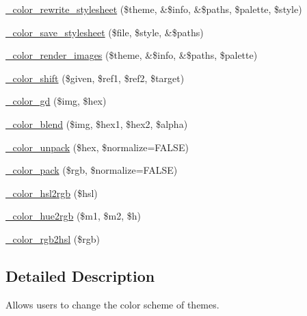 \begin{DoxyCompactItemize}
\item 
\hyperlink{color_8module_aaf1af457b60024710ca91d4563463267}{\_\-color\_\-rewrite\_\-stylesheet} (\$theme, \&\$info, \&\$paths, \$palette, \$style)
\item 
\hyperlink{color_8module_a571b92edd3294e4d7c87092cb3f695d3}{\_\-color\_\-save\_\-stylesheet} (\$file, \$style, \&\$paths)
\item 
\hyperlink{color_8module_a2a6f1003889c56a433d0223fa02849b2}{\_\-color\_\-render\_\-images} (\$theme, \&\$info, \&\$paths, \$palette)
\item 
\hyperlink{color_8module_ae1e559de5aa681e57757d3505974f40b}{\_\-color\_\-shift} (\$given, \$ref1, \$ref2, \$target)
\item 
\hyperlink{color_8module_ac3717db6e9a7aefc73041cf66d5b5a28}{\_\-color\_\-gd} (\$img, \$hex)
\item 
\hyperlink{color_8module_a06c2b0a7394a29e34dd9499bc440b94c}{\_\-color\_\-blend} (\$img, \$hex1, \$hex2, \$alpha)
\item 
\hyperlink{color_8module_aa8b05ebeece6ab52b7d5b7f8b39637e8}{\_\-color\_\-unpack} (\$hex, \$normalize=FALSE)
\item 
\hyperlink{color_8module_aa35d909dd69c401ec5d88bc32db976e5}{\_\-color\_\-pack} (\$rgb, \$normalize=FALSE)
\item 
\hyperlink{color_8module_abfa1f17c627b57e5cb9fc077abd35f73}{\_\-color\_\-hsl2rgb} (\$hsl)
\item 
\hyperlink{color_8module_a54cc5426150360922c74075fcea9e974}{\_\-color\_\-hue2rgb} (\$m1, \$m2, \$h)
\item 
\hyperlink{color_8module_ae85c23b1c5dd7c9e5dbb86f7684edb6c}{\_\-color\_\-rgb2hsl} (\$rgb)
\end{DoxyCompactItemize}


\subsection{Detailed Description}
Allows users to change the color scheme of themes. 

